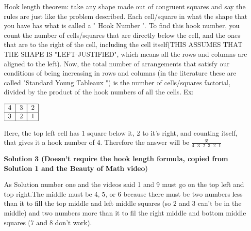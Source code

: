 \begin{enumerate}
 Hook length theorem: take any shape made out of congruent squares and say the rules are just like the problem described. Each cell/square in what the shape that you have has what is called a " Hook Number ". To find this hook number, you count the number of cells/squares that are directly below the cell, and the ones that are to the right of the cell, including the cell itself(THIS ASSUMES THAT THE SHAPE IS "LEFT-JUSTIFIED", which means all the rows and columns are aligned to the left). Now, the total number of arrangements that satisfy our conditions of being increasing in rows and columns (in the literature these are called "Standard Young Tableaux ") is the number of cells/squares factorial, divided by the product of the hook numbers of all the cells. Ex: 

 $\begin{tabular}{|c|c|c|} \hline 4 & 3 & 2\\ \hline 3 & 2 & 1\\ \hline \end{tabular}$

 Here, the top left cell has 1 square below it, 2 to it's right, and counting itself, that gives it a hook number of 4. Therefore the answer will be $\frac{6!}{4\cdot 3 \cdot 2 \cdot 3 \cdot 2 \cdot 1}$




\textbf{Solution 3 (Doesn't require the hook length formula, copied from Solution 1 and the Beauty of Math video)}

As Solution number one and the videos said 1 and 9 must go on the top left and top right.The middle must be 4, 5, or 6 because there must be two numbers less than it to fill the top middle and left middle squares (so 2 and 3 can't be in the middle) and two numbers more than it to fil the right middle and bottom middle squares (7 and 8 don’t work).


\end{enumerate}
